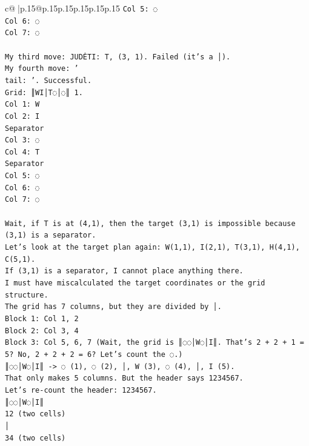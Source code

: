 \documentclass{article}
\begin{document}
{\begin{supertabular}{c@{$\;$}|p{.15\linewidth}@{}p{.15\linewidth}p{.15\linewidth}p{.15\linewidth}p{.15\linewidth}p{.15\linewidth}}
{{{\texttt{Col 5: ◌} \\
\texttt{Col 6: ◌} \\
\texttt{Col 7: ◌} \\
\\ 
\texttt{My third move: JUDĖTI: T, (3, 1). Failed (it's a │).} \\
\texttt{My fourth move: '} \\
\texttt{tail: '. Successful.} \\
\texttt{Grid: ║WI│T◌│◌║ 1.} \\
\texttt{Col 1: W} \\
\texttt{Col 2: I} \\
\texttt{Separator} \\
\texttt{Col 3: ◌} \\
\texttt{Col 4: T} \\
\texttt{Separator} \\
\texttt{Col 5: ◌} \\
\texttt{Col 6: ◌} \\
\texttt{Col 7: ◌} \\
\\ 
\texttt{Wait, if T is at (4,1), then the target (3,1) is impossible because (3,1) is a separator.} \\
\texttt{Let's look at the target plan again: W(1,1), I(2,1), T(3,1), H(4,1), C(5,1).} \\
\texttt{If (3,1) is a separator, I cannot place anything there.} \\
\texttt{I must have miscalculated the target coordinates or the grid structure.} \\
\texttt{The grid has 7 columns, but they are divided by │.} \\
\texttt{Block 1: Col 1, 2} \\
\texttt{Block 2: Col 3, 4} \\
\texttt{Block 3: Col 5, 6, 7 (Wait, the grid is ║◌◌│W◌│I║. That's 2 + 2 + 1 = 5? No, 2 + 2 + 2 = 6? Let's count the ◌.)} \\
\texttt{║◌◌│W◌│I║ {-}> ◌ (1), ◌ (2), │, W (3), ◌ (4), │, I (5).} \\
\texttt{That only makes 5 columns. But the header says 1234567.} \\
\texttt{Let's re{-}count the header: 1234567.} \\
\texttt{║◌◌│W◌│I║} \\
\texttt{12 (two cells)} \\
\texttt{│} \\
\texttt{34 (two cells)} \\
}}}
\end{supertabular}}
\end{document}

